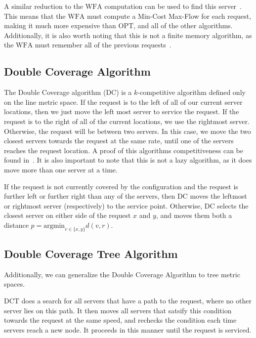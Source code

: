 A similar reduction to the $\mathrm{WFA}$ computation can be used to find this server~\cite{WFA2009}. This means that the $\mathrm{WFA}$ must compute a Min-Cost Max-Flow for each request, making it much more expensive than $\mathrm{OPT}$, and all of the other algorithms. Additionally, it is also worth noting that this is not a finite memory algorithm, as the $\mathrm{WFA}$ must remember all of the previous requests~\cite{MAXMAX2005}. 

\subsection{Double Coverage Algorithm}
\label{sec:DC}
The Double Coverage algorithm ($\mathrm{DC}$) is a $k$-competitive algorithm defined only on the line metric space. If the request is to the left of all of our current server locations, then we just move the left most server to service the request. If the request is to the right of all of the current locations, we use the rightmost server. Otherwise, the request will be between two servers. In this case, we move the two closest servers towards the request at the same rate, until one of the servers reaches the request location. A proof of this algorithms competitiveness can be found in~\cite{OnlineComp1998}. It is also important to note that this is not a lazy algorithm, as it does move more than one server at a time. 

\begin{definition}
    If the request is not currently covered by the configuration and the request is further left or further right than any of the servers, then $\mathrm{DC}$ moves the leftmost or rightmost server (respectively) to the service point. Otherwise, $\mathrm{DC}$ selects the closest server on either side of the request $x$ and $y$, and moves them both a distance $p = \mathrm{argmin}_{v \in \{x, y\}} d(v, r)$.
\end{definition}

\subsection{Double Coverage Tree Algorithm}
Additionally, we can generalize the Double Coverage Algorithm to tree metric spaces. 

\begin{definition}
    $\mathrm{DCT}$ does a search for all servers that have a path to the request, where no other server lies on this path. It then moves all servers that satsify this condition towards the request at the same speed, and rechecks the condition each time servers reach a new node. It proceeds in this manner until the request is serviced.
\end{definition}

